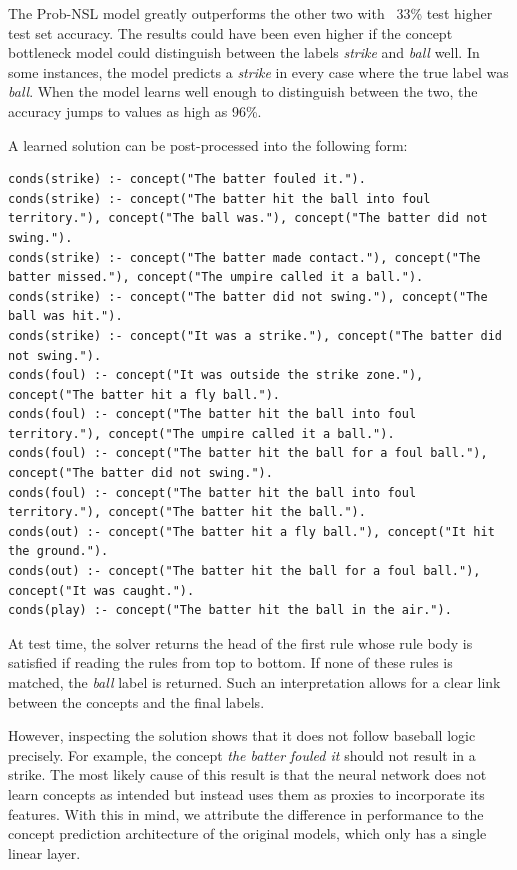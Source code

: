 The Prob-NSL model greatly outperforms the other two with ~33\% test higher test set accuracy.
The results could have been even higher if the concept bottleneck model could distinguish between the labels \emph{strike} and \emph{ball} well.
In some instances, the model predicts a \emph{strike} in every case where the true label was \emph{ball}.
When the model learns well enough to distinguish between the two, the accuracy jumps to values as high as 96\%.

A learned solution can be post-processed into the following form:
\begin{lstlisting}
conds(strike) :- concept("The batter fouled it.").
conds(strike) :- concept("The batter hit the ball into foul territory."), concept("The ball was."), concept("The batter did not swing.").
conds(strike) :- concept("The batter made contact."), concept("The batter missed."), concept("The umpire called it a ball.").
conds(strike) :- concept("The batter did not swing."), concept("The ball was hit.").
conds(strike) :- concept("It was a strike."), concept("The batter did not swing.").
conds(foul) :- concept("It was outside the strike zone."), concept("The batter hit a fly ball.").
conds(foul) :- concept("The batter hit the ball into foul territory."), concept("The umpire called it a ball.").
conds(foul) :- concept("The batter hit the ball for a foul ball."), concept("The batter did not swing.").
conds(foul) :- concept("The batter hit the ball into foul territory."), concept("The batter hit the ball.").
conds(out) :- concept("The batter hit a fly ball."), concept("It hit the ground.").
conds(out) :- concept("The batter hit the ball for a foul ball."), concept("It was caught.").
conds(play) :- concept("The batter hit the ball in the air.").
\end{lstlisting}

At test time, the solver returns the head of the first rule whose rule body is satisfied if reading the rules from top to bottom.
If none of these rules is matched, the \emph{ball} label is returned.
Such an interpretation allows for a clear link between the concepts and the final labels.

However, inspecting the solution shows that it does not follow baseball logic precisely. For example, the concept \emph{the batter fouled it} should not result in a strike.
The most likely cause of this result is that the neural network does not learn concepts as intended but instead uses them as proxies to incorporate its features.
With this in mind, we attribute the difference in performance to the concept prediction architecture of the original models, which only has a single linear layer.


